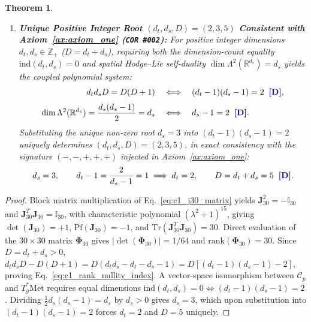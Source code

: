 \documentclass[11pt,a4paper]{article}
\newcommand{\catD}{\text{\textbf{\textcolor{blue!75!black}{[D]}}}}
\theoremstyle{definition}
\theoremstyle{plain}
\newtheorem{theorem}[axiom]{Theorem}
\theoremstyle{remark}
\begin{document}
\begin{theorem}
\begin{enumerate}[label=(\roman*)]
\begin{enumerate}[label=(\alph*)]
    \begin{equation}\label{eq:c1_cartan_30}
    \mathcal{N}_{\mathrm{Cartan}} \equiv d_t\,d_s\,D = \mathrm{Tr}\!\left(\mathbf{J}_{30}^T\mathbf{J}_{30}\right) = D(D+1) = 30 \;\;\catD.
    \end{equation}
  \end{enumerate}
  \item \textbf{Unique Positive Integer Root $(d_t, d_s, D) = (2, 3, 5)$ Consistent with Axiom~\ref{ax:axiom_one} (\texttt{COR~\#002}):}
  For positive integer dimensions $d_t, d_s \in \mathbb{Z}_+$ ($D = d_t + d_s$), requiring both the dimension-count equality $\mathrm{ind}(d_t, d_s) = 0$ and spatial Hodge--Lie self-duality $\dim\Lambda^2(\mathbb{R}^{d_s}) = d_s$ yields the coupled polynomial system:
  \begin{align}
  d_t d_s D = D(D+1) &\quad\Longleftrightarrow\quad (d_t - 1)(d_s - 1) = 2 \;\;\catD, \nonumber \\[3pt]
  \dim\Lambda^2(\mathbb{R}^{d_s}) = \frac{d_s(d_s - 1)}{2} = d_s &\quad\Longleftrightarrow\quad d_s - 1 = 2 \;\;\catD. \label{eq:c1_diophantine}
  \end{align}
  Substituting the unique non-zero root $d_s = 3$ into $(d_t - 1)(d_s - 1) = 2$ uniquely determines $(d_t, d_s, D) = (2, 3, 5)$, in exact consistency with the signature $(-,-,+,+,+)$ injected in Axiom~\ref{ax:axiom_one}:
  \begin{equation}\label{eq:c1_unique_235}
  d_s = 3, \qquad
  d_t - 1 = \frac{2}{d_s - 1} = 1 \implies d_t = 2, \qquad
  D = d_t + d_s = 5 \;\;\catD.
  \end{equation}
\end{enumerate}
\end{theorem}

\begin{proof}
Block matrix multiplication of Eq.~\eqref{eq:c1_j30_matrix} yields $\mathbf{J}_{30}^2 = -\mathbb{I}_{30}$ and $\mathbf{J}_{30}^T\mathbf{J}_{30} = \mathbb{I}_{30}$, with characteristic polynomial $(\lambda^2 + 1)^{15}$, giving $\det(\mathbf{J}_{30}) = +1$, $\mathrm{Pf}(\mathbf{J}_{30}) = -1$, and $\mathrm{Tr}(\mathbf{J}_{30}^T\mathbf{J}_{30}) = 30$. Direct evaluation of the $30\times 30$ matrix $\bm{\Phi}_{30}$ gives $|\det(\bm{\Phi}_{30})| = 1/64$ and $\mathrm{rank}(\bm{\Phi}_{30}) = 30$. Since $D = d_t + d_s > 0$, $d_t d_s D - D(D+1) = D(d_t d_s - d_t - d_s - 1) = D[(d_t - 1)(d_s - 1) - 2]$, proving Eq.~\eqref{eq:c1_rank_nullity_index}. A vector-space isomorphism between $\mathcal{C}_p$ and $T^*_g\mathrm{Met}$ requires equal dimensions $\mathrm{ind}(d_t, d_s) = 0 \iff (d_t - 1)(d_s - 1) = 2$. Dividing $\frac{1}{2}d_s(d_s - 1) = d_s$ by $d_s > 0$ gives $d_s = 3$, which upon substitution into $(d_t - 1)(d_s - 1) = 2$ forces $d_t = 2$ and $D = 5$ uniquely.
\end{proof}
\end{document}
